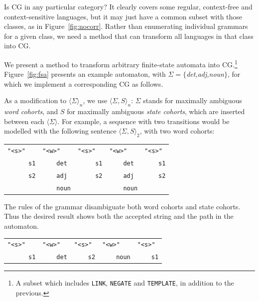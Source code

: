 \documentclass[11pt]{article}
\def\wwf{\t{"<w>"}}
\def\swf{\t{"<s>"}}
\def\t#1{\texttt{#1}}
\def\maxAmb#1{$\langle \Sigma \rangle_#1$}
\def\maxAmbFSA#1{$\langle \Sigma,S \rangle_#1$}
\begin{document}
Is CG in any particular category? It clearly covers some regular, context-free
and context-sensitive languages, but it may just have a common subset with those 
classes, as in Figure~\ref{fig:nocorr}.
Rather than enumerating individual grammars for a given class, we need a method 
that can transform all languages in that class into CG.


We present a method to transform arbitrary finite-state automata into CG.\footnote{A subset which includes \t{LINK}, \t{NEGATE} and \t{TEMPLATE}, in addition to the previous.}
Figure~\ref{fig:fsa} presents an example automaton, with $\Sigma = \{$\emph{det,adj,noun}$\}$,
for which we implement a corresponding CG as follows.

As a modification to \maxAmb{n}, we use \maxAmbFSA{n}:
$\Sigma$ stands for maximally ambiguous \emph{word cohorts}, and $S$ for 
maximally ambiguous  \emph{state cohorts}, which are inserted between 
each $\langle \Sigma \rangle$. For example, a sequence with two transitions 
would be modelled with the following sentence \maxAmbFSA{2}, with two word cohorts:

\begin{table}[h]
\begin{tabular}{lllll}
      \swf    &    \wwf      &      \swf      &     \wwf      &     \swf     \\
 ~~~~~~\t{s1} & ~~~~\t{det}  &  ~~~~\t{ s1}   &  ~~~~\t{det}  &  ~~~~\t{s1}  \\
 ~~~~~~\t{s2} & ~~~~\t{adj}  &  ~~~~\t{ s2}   &  ~~~~\t{adj}  &  ~~~~\t{s2}  \\
              & ~~~~\t{noun} &                &  ~~~~\t{noun} &  
\end{tabular}
\end{table}

The rules of the grammar disambiguate both word cohorts and state cohorts.
Thus the desired result shows both the accepted string and the path in the automaton.

\begin{table}[h]
\centering
\begin{tabular}{lllll}
      \swf    &  \wwf       &      \swf     & \wwf           & \swf \\
 ~~~~~~\t{s1} & ~~~~\t{det} &  ~~~~\t{s2}   &  ~~~~\t{noun}  &  ~~~~\t{s1} 

\end{tabular}
\end{table}
\end{document}
